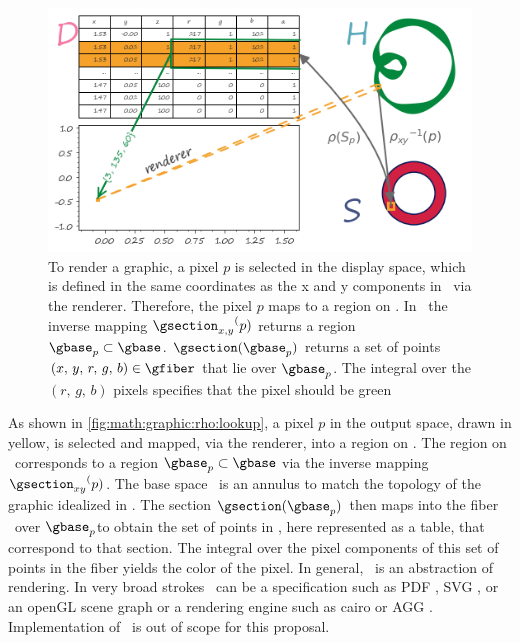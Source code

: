 \documentclass[../main.tex]{subfiles}
\begin{document}
\begin{figure}[H]
    \includegraphics[width=\textwidth]{figures/math/render.png}
    \caption{To render a graphic, a pixel \(p\) is selected in the display space, which is defined in the same coordinates as the x and y components in \gfiber\ via the renderer. Therefore, the pixel \(p\) maps to a region on \gtotal. In \gtotal\, the inverse mapping \({\gsection_{x,y}}^(p)\) returns a region \(\gbase_{p} \subset \gbase\). \(\gsection(\gbase_{p})\) returns a set of points \((x,\,y,\,r,\,g,\,b) \in \gfiber\) that lie over \(\gbase_{p}\). The integral over the \((r,\,g,\,b)\) pixels specifies that the pixel should be green}
    \label{fig:math:graphic:rho:lookup}
\end{figure}

As shown in \autoref{fig:math:graphic:rho:lookup}, a pixel \(p\) in the output space, drawn in yellow, is selected and mapped, via the renderer, into a region on \gtotal.  The region on \gtotal\ corresponds to a region \(\gbase_p \subset \gbase\) via the inverse mapping  \({\gsection_{xy}}^(p)\). The base space \gbase\ is an annulus to match the topology of the graphic idealized in \gtotal. The section  \(\gsection(\gbase_{p})\) then maps into the fiber \gfiber\ over \(\gbase_p\)to obtain the set of points in \gfiber, here represented as a table, that correspond to that section. The integral over the pixel components of this set of points in the fiber yields the color of the pixel. In general, \gsection\ is an abstraction of rendering. In very broad strokes \gsection\ can be a specification such as PDF \cite{bienz1993portable}, SVG \cite{quintScalable2003}, or an openGL scene graph \cite{CarsonOpenGL1997} or a rendering engine such as cairo \cite{CairographicsOrg} or AGG \cite{shemanarevAntiGrainGeometry}. Implementation of \gsection\ is out of scope for this proposal. 
\end{document}
